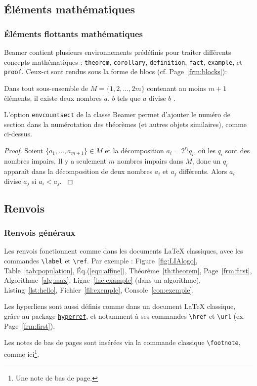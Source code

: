 \documentclass[10pt,    %
    french,             %
    xcolor=table,       %
    envcountsect,       %
    aspectratio=43      %
]{beamer}
\begin{document}
\subsection{Éléments mathématiques}
\begin{frame}
    \frametitle{Éléments flottants mathématiques}
    \small
    
    Beamer contient plusieurs environnements prédéfinis pour traiter différents concepts mathématiques : \texttt{theorem}, \texttt{corollary}, \texttt{definition}, \texttt{fact}, \texttt{example}, et \texttt{proof}. Ceux-ci sont rendus sous la forme de blocs (cf. Page~\ref{frm:blocks}):
    
    \begin{theorem}
        Dans tout sous-ensemble de $M = \{1, 2, ... , 2m\}$ contenant au moins $m + 1$ éléments, il existe deux nombres $a$, $b$ tels que $a$ divise $b$ \cite{Neunhauserer2013}.
        \label{th:theorem}
    \end{theorem} 
    
    L'option \texttt{envcountsect} de la classe Beamer permet d'ajouter le numéro de section dans la numérotation des théorèmes (et autres objets similaires), comme ci-dessus.
    
    \begin{proof}
         Soient $\{a_1, . . . , a_{m+1}\} \in M$ et la décomposition $a_i = 2^{r_i} q_i$, où les $q_i$ sont des nombres impairs. Il y a seulement $m$ nombres impairs dans $M$, donc un $q_i$ apparaît dans la décomposition de deux nombres $a_i$ et $a_j$ différents. Alors $a_i$ divise $a_j$ si $a_i < a_j$.
        \label{th:proof}
    \end{proof} 
\end{frame}
    




\subsection{Renvois}
\begin{frame}
    \frametitle{Renvois généraux} 
    
    Les renvois fonctionnent comme dans les documents \LaTeX{} classiques, avec les commandes \texttt{\textbackslash{}label} et \texttt{\textbackslash{}ref}. Par exemple : Figure~\ref{fig:LIAlogo}, Table~\ref{tab:population}, Éq.(\ref{equ:affine}), Théorème~\ref{th:theorem}, Page~\ref{frm:first}, Algorithme~\ref{alg:max}, Ligne~\ref{lne:example} (dans un algorithme), Listing~\ref{lst:hello}, Fichier~\ref{fil:exemple}, Console~\ref{con:exemple}.
    
    \medskip
    Les hyperliens sont aussi définis comme dans un document \LaTeX{} classique, grâce au package \href{https://ctan.org/pkg/hyperref?lang=en}{\texttt{hyperref}}, et notamment à ses commandes \texttt{\textbackslash{}href} et \texttt{\textbackslash{}url} (ex. Page~\ref{frm:first}).
    
    \medskip
    Les notes de bas de pages sont insérées via la commande classique \texttt{\textbackslash{}footnote}, comme ici\footnote{Une note de bas de page.}.
\end{frame}
\end{document}
